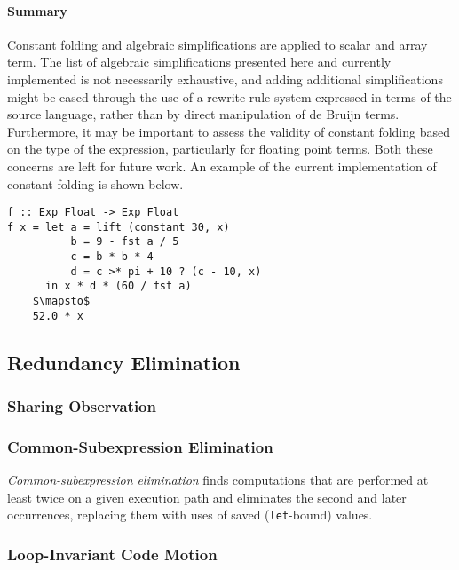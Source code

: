 \paragraph{Summary}

Constant folding and algebraic simplifications are applied to scalar and array
term. The list of algebraic simplifications presented here and currently
implemented is not necessarily exhaustive, and adding additional simplifications
might be eased through the use of a rewrite rule system expressed in terms of
the source language, rather than by direct manipulation of de Bruijn terms.
Furthermore, it may be important to assess the validity of constant folding
based on the type of the expression, particularly for floating point
terms. Both these concerns are left for future work. An example of the current
implementation of constant folding is shown below.

\begin{lstlisting}[style=Haskell,mathescape,caption={Example of constant expression evaluation}]
f :: Exp Float -> Exp Float
f x = let a = lift (constant 30, x)
          b = 9 - fst a / 5
          c = b * b * 4
          d = c >* pi + 10 ? (c - 10, x)
      in x * d * (60 / fst a)
    $\mapsto$
    52.0 * x
\end{lstlisting}


\subsection{Redundancy Elimination}


\subsubsection{Sharing Observation}

\subsubsection{Common-Subexpression Elimination}
\label{sec:cse}

\emph{Common-subexpression elimination} finds computations that are performed at
least twice on a given execution path and eliminates the second and later
occurrences, replacing them with uses of saved (\texttt{let}-bound) values.

\subsubsection{Loop-Invariant Code Motion}



